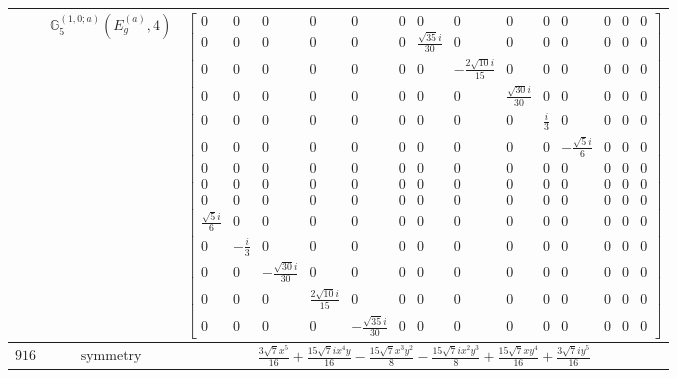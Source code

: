 \documentclass[fleqn,8pt,landscape]{jsarticle}
\begin{document}
\begin{longtable}{ccc}
$  $ & $ \mathbb{G}_{5}^{(1,0;a)}(E_{g}^{(a)},4) $ & $ \begin{bmatrix} 0 & 0 & 0 & 0 & 0 & 0 & 0 & 0 & 0 & 0 & 0 & 0 & 0 & 0 \\ 0 & 0 & 0 & 0 & 0 & 0 & \frac{\sqrt{35} i}{30} & 0 & 0 & 0 & 0 & 0 & 0 & 0 \\ 0 & 0 & 0 & 0 & 0 & 0 & 0 & - \frac{2 \sqrt{10} i}{15} & 0 & 0 & 0 & 0 & 0 & 0 \\ 0 & 0 & 0 & 0 & 0 & 0 & 0 & 0 & \frac{\sqrt{30} i}{30} & 0 & 0 & 0 & 0 & 0 \\ 0 & 0 & 0 & 0 & 0 & 0 & 0 & 0 & 0 & \frac{i}{3} & 0 & 0 & 0 & 0 \\ 0 & 0 & 0 & 0 & 0 & 0 & 0 & 0 & 0 & 0 & - \frac{\sqrt{5} i}{6} & 0 & 0 & 0 \\ 0 & 0 & 0 & 0 & 0 & 0 & 0 & 0 & 0 & 0 & 0 & 0 & 0 & 0 \\ 0 & 0 & 0 & 0 & 0 & 0 & 0 & 0 & 0 & 0 & 0 & 0 & 0 & 0 \\ 0 & 0 & 0 & 0 & 0 & 0 & 0 & 0 & 0 & 0 & 0 & 0 & 0 & 0 \\ \frac{\sqrt{5} i}{6} & 0 & 0 & 0 & 0 & 0 & 0 & 0 & 0 & 0 & 0 & 0 & 0 & 0 \\ 0 & - \frac{i}{3} & 0 & 0 & 0 & 0 & 0 & 0 & 0 & 0 & 0 & 0 & 0 & 0 \\ 0 & 0 & - \frac{\sqrt{30} i}{30} & 0 & 0 & 0 & 0 & 0 & 0 & 0 & 0 & 0 & 0 & 0 \\ 0 & 0 & 0 & \frac{2 \sqrt{10} i}{15} & 0 & 0 & 0 & 0 & 0 & 0 & 0 & 0 & 0 & 0 \\ 0 & 0 & 0 & 0 & - \frac{\sqrt{35} i}{30} & 0 & 0 & 0 & 0 & 0 & 0 & 0 & 0 & 0 \end{bmatrix} $ \\ \hline
$ 916 $ & $ \text{symmetry} $ & $ \frac{3 \sqrt{7} x^{5}}{16} + \frac{15 \sqrt{7} i x^{4} y}{16} - \frac{15 \sqrt{7} x^{3} y^{2}}{8} - \frac{15 \sqrt{7} i x^{2} y^{3}}{8} + \frac{15 \sqrt{7} x y^{4}}{16} + \frac{3 \sqrt{7} i y^{5}}{16} $ \\

\end{longtable}
\end{document}
